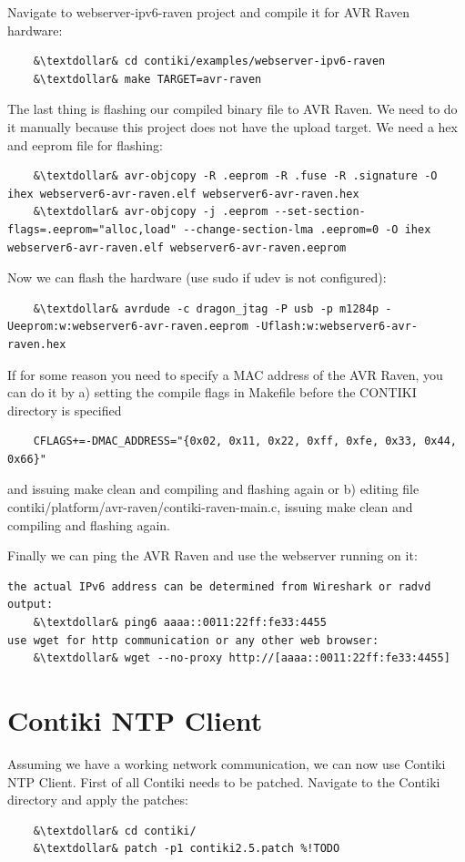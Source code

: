 \documentclass{article}
\begin{document}
Navigate to webserver-ipv6-raven project and compile it for AVR Raven hardware:
\begin{lstlisting}
	&\textdollar& cd contiki/examples/webserver-ipv6-raven
	&\textdollar& make TARGET=avr-raven
\end{lstlisting}


The last thing is flashing our compiled binary file to AVR Raven.
We need to do it manually because this project does not have the upload target.
We need a hex and eeprom file for flashing:
\begin{lstlisting}
	&\textdollar& avr-objcopy -R .eeprom -R .fuse -R .signature -O ihex webserver6-avr-raven.elf webserver6-avr-raven.hex
	&\textdollar& avr-objcopy -j .eeprom --set-section-flags=.eeprom="alloc,load" --change-section-lma .eeprom=0 -O ihex webserver6-avr-raven.elf webserver6-avr-raven.eeprom
\end{lstlisting}
Now we can flash the hardware (use sudo if udev is not configured):
\begin{lstlisting}
	&\textdollar& avrdude -c dragon_jtag -P usb -p m1284p -Ueeprom:w:webserver6-avr-raven.eeprom -Uflash:w:webserver6-avr-raven.hex
\end{lstlisting}


If for some reason you need to specify a MAC address of the AVR Raven, you can do it by
a) setting the compile flags in Makefile before the CONTIKI directory is specified
\begin{lstlisting}
	CFLAGS+=-DMAC_ADDRESS="{0x02, 0x11, 0x22, 0xff, 0xfe, 0x33, 0x44, 0x66}"
\end{lstlisting}
and issuing make clean and compiling and flashing again
or
b) editing file contiki/platform/avr-raven/contiki-raven-main.c,
issuing make clean and compiling and flashing again.

Finally we can ping the AVR Raven and use the webserver running on it:
\begin{lstlisting}
the actual IPv6 address can be determined from Wireshark or radvd output:
	&\textdollar& ping6 aaaa::0011:22ff:fe33:4455
use wget for http communication or any other web browser:
	&\textdollar& wget --no-proxy http://[aaaa::0011:22ff:fe33:4455]
\end{lstlisting}

\section{Contiki NTP Client}
Assuming we have a working network communication,
we can now use Contiki NTP Client.
First of all Contiki needs to be patched.
Navigate to the Contiki directory and apply the patches:
\begin{lstlisting}
	&\textdollar& cd contiki/
	&\textdollar& patch -p1 contiki2.5.patch %!TODO
\end{lstlisting}
\end{document}
